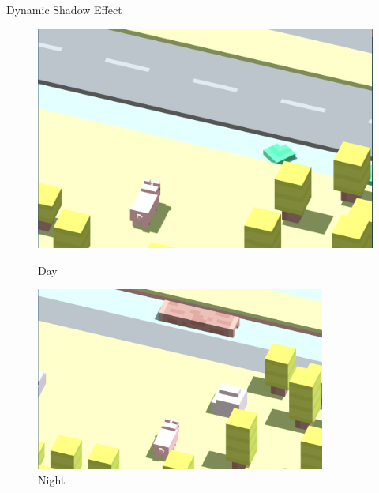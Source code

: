 \documentclass[13.5pt,aspecratio=169, xcolor=dvipsnames]{beamer}
\begin{document}
\begin{frame}
    
         {
            \begin{minipage}{0.4\textwidth}
                \begin{block}{}
                    \centering
                    Dynamic Shadow Effect
                \end{block}
            \end{minipage}
    
            \begin{figure}[h]
                \begin{minipage}{0.4\textwidth}
                    \centering
                    \includegraphics[height=0.4\textheight, width=1.1\textwidth]{shadow_right.png}
                    \caption{Day}
                \end{minipage}
                \begin{minipage}{0.5\textwidth}
                    \centering
                    \includegraphics[height=0.4\textheight, width=0.85\textwidth]{shadow_left.png}
                    \caption{Night}
                \end{minipage}
            \end{figure}
        }
    

\end{frame}
\end{document}
